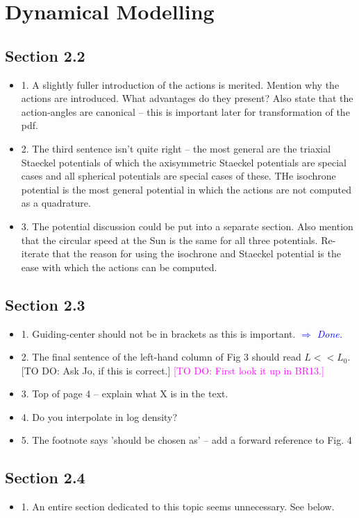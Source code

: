 \documentclass[10pt,a4paper]{article}
\newcommand{\Wilma}[1]{\textcolor{Magenta}{#1}}
\newcommand{\Comment}[1]{\textsl{\textcolor{Blue}{$\Longrightarrow$ {#1}}}}
\newcommand{\Jo}[1]{\textcolor{YellowOrange}{#1}}
\begin{document}
\section{Dynamical Modelling}

\subsection{Section 2.2}
\begin{itemize}
\item 1. A slightly fuller introduction of the actions is merited. Mention why the actions are introduced. What advantages do they present? Also state that the action-angles are canonical -- this is important later for transformation of the pdf.
\item 2. The third sentence isn't quite right -- the most general are the triaxial
Staeckel potentials of which the axisymmetric Staeckel potentials are special cases
and all spherical potentials are special cases of these. THe isochrone potential is
the most general potential in which the actions are not computed as a quadrature.
\item 3. The potential discussion could be put into a separate section. Also mention that the circular speed at the Sun is the same for all three potentials. Re-iterate that the reason for using the isochrone and Staeckel potential is the ease with which the actions can be computed.
\end{itemize}

\subsection{Section 2.3}
\begin{itemize}
\item 1. Guiding-center should not be in brackets as this is important. \Comment{Done.}
\item 2. The final sentence of the left-hand column of Fig 3 should read $L<<L_0$. \Jo{[TO DO: Ask Jo, if this is correct.]} \Wilma{[TO DO: First look it up in BR13.]}
\item 3. Top of page 4 -- explain what X is in the text.
\item 4. Do you interpolate in log density?
\item 5. The footnote says 'should be chosen as' -- add a forward reference to Fig. 4
\end{itemize}

\subsection{Section 2.4}
\begin{itemize}
\item 1. An entire section dedicated to this topic seems unnecessary. See below.
\end{itemize}
\end{document}
